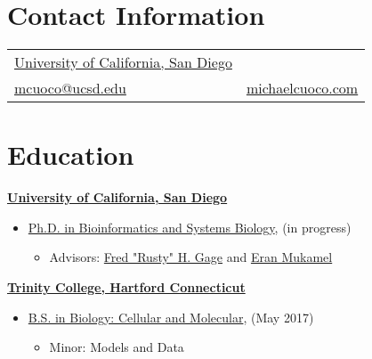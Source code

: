 \documentclass[margin,line]{res}
\begin{document}
\begin{resume}


\section{\sc Contact Information}
\vspace{.05in}
\begin{tabular}{@{}p{2.75in}p{2in}}
\href{http://www.ucsd.edu/}{University of California, San Diego} \\
\href{mailto:mcuoco@ucsd.edu}{mcuoco@ucsd.edu} & \href{https://michaelcuoco.com}{michaelcuoco.com}\\
\end{tabular}

\section{\sc Education}
{\bf \href{http://www.ucsd.edu/}{University of California, San Diego}}\\
\vspace*{-.1in}
\begin{itemize}
    \item[] \hspace*{-2mm}\href{http://bioinformatics.ucsd.edu/}{Ph.D. in Bioinformatics and Systems Biology}, (in progress)
    \begin{itemize}
        \item Advisors: \href{https://www.salk.edu/scientist/rusty-gage/}{Fred "Rusty" H. Gage} and \href{https://cogsci.ucsd.edu/people/faculty/eran-mukamel.html}{Eran Mukamel}
    \end{itemize}
\end{itemize}
{\bf \href{https://www.trincoll.edu/}{Trinity College, Hartford Connecticut}}\\
\vspace*{-.1in}
\begin{itemize}
    \item[] \hspace*{-2mm}\href{https://www.trincoll.edu/biology/}{B.S. in Biology: Cellular and Molecular}, (May 2017)
    \begin{itemize}
        \item Minor: Models and Data
    \end{itemize}
\end{itemize}


\end{resume}
\end{document}
